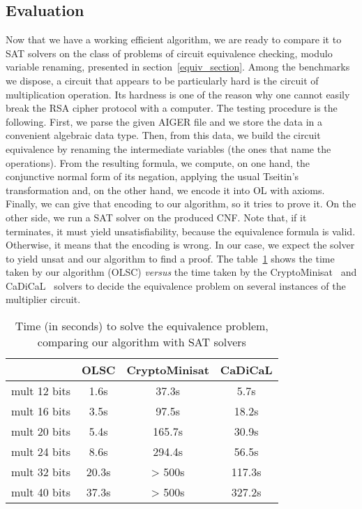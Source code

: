 \documentclass[a4paper, 11pt]{article}
\begin{document}
    \subsection{Evaluation}
    Now that we have a working efficient algorithm, we are ready to compare it to SAT solvers on the
    class of problems of circuit equivalence checking, modulo variable renaming, presented in 
    section~\ref{equiv_section}. Among the benchmarks we dispose, a circuit that appears to be
    particularly hard is the circuit of multiplication operation. Its hardness is one of the reason
    why one cannot easily break the RSA cipher protocol with a computer. The testing procedure is the
    following. First, we parse the given AIGER file and we store the data in a convenient algebraic
    data type. Then, from this data, we build the circuit equivalence by renaming the intermediate
    variables (the ones that name the operations). From the resulting formula, we compute, on one hand, 
    the conjunctive normal form of its negation, applying the usual Tseitin's transformation and, on 
    the other hand, we
    encode it into OL with axioms. Finally, we can give that encoding to our algorithm, so it tries
    to prove it. On the other side, we run a SAT solver on the produced CNF. Note that, if it terminates,
    it must yield unsatisfiability, because the equivalence formula is valid. Otherwise, it means that
    the encoding is wrong. 
    In our case, we expect the solver to yield unsat and our algorithm to find a proof.
    The table~\ref{benchmark_equiv} shows the time taken by our algorithm (OLSC) \textit{versus} the time
    taken by the CryptoMinisat~\cite{10.1007/978-3-642-02777-2_24} and
    CaDiCaL~\cite{BiereFallerFazekasFleuryFroleyks-CAV24} solvers to decide the equivalence problem on
    several instances of the multiplier circuit.
    \begin{table}[h] 
	    \begin{center}
		    \begin{tabular}{|c|c|c|c|}
			    \hline
			     &OLSC&CryptoMinisat&CaDiCaL\\
			     \hline
			     mult 12 bits&1.6s&37.3s&5.7s\\
			     mult 16 bits&3.5s&97.5s&18.2s\\
			     mult 20 bits&5.4s&165.7s&30.9s\\
			     mult 24 bits&8.6s&294.4s&56.5s\\
			     mult 32 bits&20.3s&> 500s&117.3s\\
			     mult 40 bits&37.3s&> 500s&327.2s\\
			     \hline
		    \end{tabular}
	    \end{center}
	    \caption{Time (in seconds) to solve the equivalence problem, comparing our algorithm with
	    SAT solvers}
	    \label{benchmark_equiv}
    \end{table}
\end{document}

